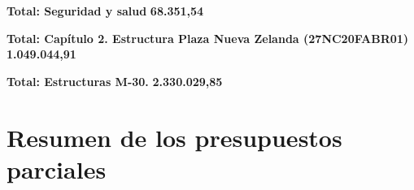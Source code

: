 \documentclass{book}%
\begin{document}
%
\noindent%
\large%
\textbf{Total: Seguridad y salud }%
\dotfill%
\textbf{68.351,54}%
\newline%
\normalsize

%
\noindent%
\large%
\textbf{Total: Capítulo 2. Estructura Plaza Nueva Zelanda (27NC20FABR01) }%
\dotfill%
\textbf{1.049.044,91}%
\newline%
\normalsize

%
\noindent%
\large%
\textbf{Total: Estructuras M{-}30. }%
\dotfill%
\textbf{2.330.029,85}%
\newline%
\normalsize

%
\part{Resumen de los presupuestos parciales}%
\label{sec:Resumendelospresupuestosparciales}%
\end{document}
